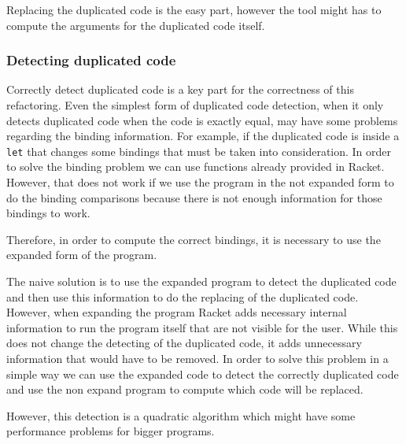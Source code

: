Replacing the duplicated code is the easy part, however the tool might has to compute %
the arguments for the duplicated code itself.

\subsubsection{Detecting duplicated code}
Correctly detect duplicated code is a key part for the correctness of this refactoring.
Even the simplest form of duplicated code detection, when it only detects duplicated code
when the code is exactly equal, may have some problems regarding the binding information.
For example, if the duplicated code is inside a {\tt let} that changes some bindings that must
be taken into consideration.
In order to solve the binding problem we can use functions already provided in Racket.
However, that does not work if we use the program in the not expanded
form to do the binding comparisons because there is not enough information for those bindings to work. %


Therefore, in order to compute the correct bindings, it is necessary to use the expanded form
of the program.

The naive solution is to use the expanded program to detect the duplicated
 code and then use this information to do the replacing of the duplicated code.
However, when expanding the program Racket adds necessary internal information to
run the program itself that are not visible for the user.
While this does not change the detecting of the duplicated code, it adds unnecessary information
that would have to be removed. %
In order to solve this problem in a simple way we can use the expanded code to detect
the correctly duplicated code and use the non expand program
to compute which code will be replaced.

However, this detection is a quadratic algorithm which might
have some performance problems for bigger programs.

